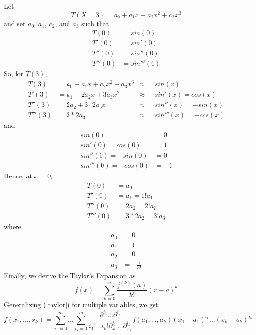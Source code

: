 \documentclass[12pt]{extarticle}
\newcommand{\<}{\langle}
\renewcommand{\>}{\rangle}
\theoremstyle{definition}
\begin{document}
\noindent Let
\begin{equation}
    T(X = 3) = a_0 + a_1 x + a_2 x^2 + a_3 x^3
\end{equation}
and set $a_0$, $a_1$, $a_2$, and $a_3$ such that
\begin{align*}
    T(0) &= sin(0)\\
    T'(0) &= sin'(0)\\
    T''(0) &= sin''(0)\\
    T'''(0) &= sin'''(0)
\end{align*}
So, for $T(3)$,
\begin{align*}
    T(3) &= a_0 + a_1 x + a_2 x^2 + a_3 x^3 & \approx \text{ } & sin(x)\\
    T'(3) &= a_1 + 2a_2 x + 3a_3 x^2 & \approx \text{ } & sin'(x) = cos(x)\\
    T''(3) &= 2a_2 + 3 \cdot 2a_3 x & \approx \text{ } & sin''(x) = -sin(x)\\
    T'''(3) &= 3*2a_3 & \approx \text{ } & sin'''(x) = -cos(x)
\end{align*}
and
\begin{align*}
    sin(0) &= 0\\
    sin'(0) = cos(0) &= 1\\
    sin''(0) = -sin(0) &= 0\\
    sin'''(0) = -cos(0) &= -1
\end{align*}
Hence, at $x = 0$,
\begin{align*}
    T(0) &= a_0\\
    T'(0) &= a_1 = 1!a_1\\
    T''(0) &= 2a_2 = 2!a_2\\
    T'''(0) &= 3*2a_2 = 3!a_3
\end{align*}
where
\begin{align*}
    a_0 & = 0 \\
    a_1 & = 1\\
    a_2 & = 0\\
    a_3 & = -\frac{1}{3!}
\end{align*}
Finally, we derive the Taylor's Expansion as
\begin{equation}
    f(x) = \sum_{k = 0}^n \frac{f^{(k)}(a)}{k!}(x - a)^k \label{taylor}
\end{equation}
Generalizing (\ref{taylor}) for multiple variables, we get
\begin{equation}
    f(x_1, \dots, x_k) = \sum_{i_1 = 0}^m \dots \sum_{i_k = 0}^m \frac{\partial^{i_1} \dots \partial^{i_k}}{i_1!\dots i_k! \partial_{x_1}^{i_1}\dots \partial_{x_k}^{i_k}} f(a_1, \dots, a_k)(x_1 - a_1)^{i_1}\dots(x_k - a_k)^{i_k} \label{genTaylor}
\end{equation}
\end{document}
